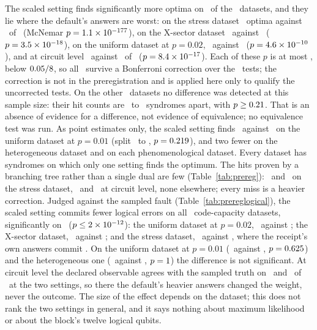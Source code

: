\documentclass[aps,pra,twocolumn,superscriptaddress,nofootinbib,longbibliography,floatfix]{revtex4-2}
\begin{document}
The scaled setting finds significantly more optima on \PrSigMore\ of the \PrDatasets\ datasets, and they lie where the default's answers are worst: on the stress dataset \PrStressHitScaled\ optima against \PrStressHitUnscaled\ of \PrStressN\ (McNemar $p=1.1\times 10^{-177}$), on the X-sector dataset \PrXsecHitScaled\ against \PrXsecHitUnscaled\ ($p=3.5\times 10^{-18}$), on the uniform dataset at $p=0.02$, \PrUniTwoHitScaled\ against \PrUniTwoHitUnscaled\ ($p=4.6\times 10^{-10}$), and at circuit level \PrCircuitHitScaled\ against \PrCircuitHitUnscaled\ of \PrCircuitN\ ($p=8.4\times 10^{-17}$). Each of these $p$ is at most \PrSigMaxP, below $0.05/8$, so all \PrSigMore\ survive a Bonferroni correction over the \PrDatasets\ tests; the correction is not in the preregistration and is applied here only to qualify the uncorrected tests. On the other \PrNoDiff\ datasets no difference was detected at this sample size: their hit counts are \PrNoDiffGapMin\ to \PrNoDiffGapMax\ syndromes apart, with $p\ge0.21$. That is an absence of evidence for a difference, not evidence of equivalence; no equivalence test was run. As point estimates only, the scaled setting finds \PrUniOneHitScaled\ against \PrUniOneHitUnscaled\ on the uniform dataset at $p=0.01$ (split \PrUniOneUnscaledOnly\ to \PrUniOneScaledOnly, $p=0.219$), and two fewer on the heterogeneous dataset and on each phenomenological dataset. Every dataset has syndromes on which only one setting finds the optimum. The hits proven by a branching tree rather than a single dual are few (Table~\ref{tab:prereg}): \PrStressTreeUnscaled\ and \PrStressTreeScaled\ on the stress dataset, \PrCircuitTreeUnscaled\ and \PrCircuitTreeScaled\ at circuit level, none elsewhere; every miss is a heavier correction. Judged against the sampled fault (Table~\ref{tab:prereglogical}), the scaled setting commits fewer logical errors on all \PrLogDatasets\ code-capacity datasets, significantly on \PrLogSig\ ($p\le2\times 10^{-12}$): the uniform dataset at $p=0.02$, \PrUniTwoLogScaled\ against \PrUniTwoLogUnscaled; the X-sector dataset, \PrXsecLogScaled\ against \PrXsecLogUnscaled; and the stress dataset, \PrStressLogScaled\ against \PrStressLogUnscaled, where the receipt's own answers commit \PrStressLogReceipt. On the uniform dataset at $p=0.01$ (\PrUniOneLogScaled\ against \PrUniOneLogUnscaled, $p=0.625$) and the heterogeneous one (\PrHeteroLogScaled\ against \PrHeteroLogUnscaled, $p=1$) the difference is not significant. At circuit level the declared observable agrees with the sampled truth on \PrCircuitObsUnscaled\ and \PrCircuitObsScaled\ of \PrCircuitN\ at the two settings, so there the default's heavier answers changed the weight, never the outcome. The size of the effect depends on the dataset; this does not rank the two settings in general, and it says nothing about maximum likelihood or about the block's twelve logical qubits.
\end{document}
